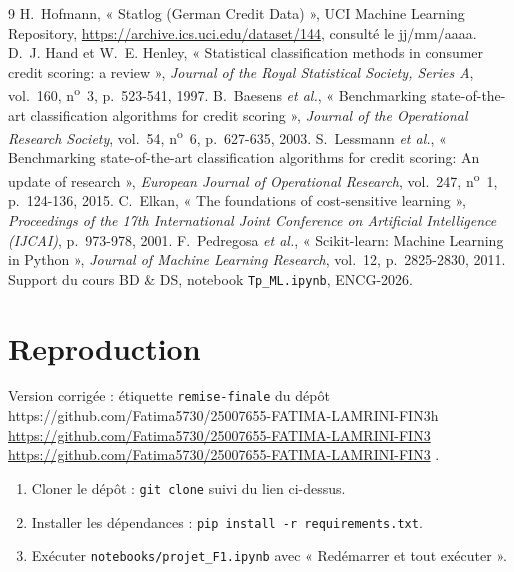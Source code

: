\documentclass[11pt,a4paper]{article}
\newcounter{nbacompleter}
\newcommand{\lienDepot}{https://github.com/Fatima5730/25007655-FATIMA-LAMRINI-FIN3}
\newcommand{\lienParDefaut} https://github.com/Fatima5730/25007655-FATIMA-LAMRINI-FIN3
\newcommand{\afficherlien}{%
  \ifx\lienDepot\lienParDefaut
    \stepcounter{nbacompleter}\textcolor{red}{\expandafter\url\expandafter{\lienDepot}}%
  \else
    \expandafter\url\expandafter{\lienDepot}%
  \fi}
\begin{document}
\begin{thebibliography}{9}
   H.~Hofmann, « Statlog (German Credit Data) », UCI Machine Learning Repository, \url{https://archive.ics.uci.edu/dataset/144}, consulté le jj/mm/aaaa.
   D.~J. Hand et W.~E. Henley, « Statistical classification methods in consumer credit scoring: a review », \textit{Journal of the Royal Statistical Society, Series A}, vol.~160, n\textsuperscript{o}~3, p.~523-541, 1997.
   B.~Baesens \textit{et al.}, « Benchmarking state-of-the-art classification algorithms for credit scoring », \textit{Journal of the Operational Research Society}, vol.~54, n\textsuperscript{o}~6, p.~627-635, 2003.
   S.~Lessmann \textit{et al.}, « Benchmarking state-of-the-art classification algorithms for credit scoring: An update of research », \textit{European Journal of Operational Research}, vol.~247, n\textsuperscript{o}~1, p.~124-136, 2015.
   C.~Elkan, « The foundations of cost-sensitive learning », \textit{Proceedings of the 17th International Joint Conference on Artificial Intelligence (IJCAI)}, p.~973-978, 2001.
   F.~Pedregosa \textit{et al.}, « Scikit-learn: Machine Learning in Python », \textit{Journal of Machine Learning Research}, vol.~12, p.~2825-2830, 2011.
   Support du cours BD \& DS, notebook \texttt{Tp\_ML.ipynb}, ENCG-2026.
\end{thebibliography}

\appendix

\section{Reproduction}
\label{ann:reproduction}
Version corrigée : étiquette \texttt{remise-finale} du dépôt \afficherlien.
\begin{enumerate}
  \item Cloner le dépôt : \texttt{git clone} suivi du lien ci-dessus.
  \item Installer les dépendances : \texttt{pip install -r requirements.txt}.
  \item Exécuter \texttt{notebooks/{projet\_F1}.ipynb} avec « Redémarrer et tout exécuter ».
\end{enumerate}
\end{document}
